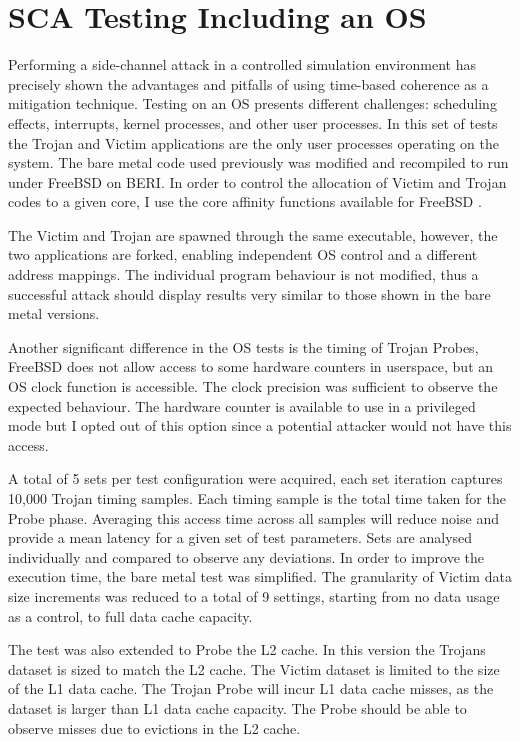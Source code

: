 \clearpage
	\section{SCA Testing Including an OS}
		\label{os_prime_probe_attack}

		Performing a side-channel attack in a controlled simulation environment has precisely shown the advantages and pitfalls of using time-based coherence as a mitigation technique. Testing on an OS presents different challenges: scheduling effects, interrupts, kernel processes, and other user processes. In this set of tests the Trojan and Victim applications are the only user processes operating on the system. The bare metal code used previously was modified and recompiled to run under FreeBSD on BERI. In order to control the allocation of Victim and Trojan codes to a given core, I use the core affinity functions available for FreeBSD \cite{cpuaffinity_0,cpuaffinity_1}. 
		
		The Victim and Trojan are spawned through the same executable, however, the two applications are forked, enabling independent OS control and a different address mappings. The individual program behaviour is not modified, thus a successful attack should display results very similar to those shown in the bare metal versions. 
		
		Another significant difference in the OS tests is the timing of Trojan Probes, FreeBSD does not allow access to some hardware counters in userspace, but an OS clock function is accessible. The clock precision was sufficient to observe the expected behaviour. The hardware counter is available to use in a privileged mode but I opted out of this option since a potential attacker would not have this access.

		A total of 5 sets per test configuration were acquired, each set iteration captures 10,000 Trojan timing samples. Each timing sample is the total time taken for the Probe phase. Averaging this access time across all samples will reduce noise and provide a mean latency for a given set of test parameters. Sets are analysed individually and compared to observe any deviations. In order to improve the execution time, the bare metal test was simplified. The granularity of Victim data size increments was reduced to a total of 9 settings, starting from no data usage as a control, to full data cache capacity. 
		
		The test was also extended to Probe the L2 cache. In this version the Trojans dataset is sized to match the L2 cache. The Victim dataset is limited to the size of the L1 data cache. The Trojan Probe will incur L1 data cache misses, as the dataset is larger than L1 data cache capacity. The Probe should be able to observe misses due to evictions in the L2 cache.

